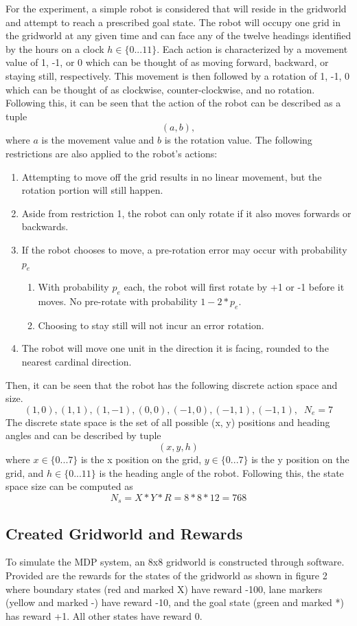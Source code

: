 \documentclass[fullpage]{article}
\begin{document}
For the experiment, a simple robot is considered that will reside in the gridworld and attempt to reach a prescribed goal state. The robot will occupy one grid in the gridworld at any given time and can face any of the twelve headings identified by the hours on a clock $h \in \{0...11\}$. Each action is characterized by a movement value of 1, -1, or 0 which can be thought of as moving forward, backward, or staying still, respectively. This movement is then followed by a rotation of 1, -1, 0 which can be thought of as clockwise, counter-clockwise, and no rotation. Following this, it can be seen that the action of the robot can be described as a tuple
\[
(a, b),
\]
where $a$ is the movement value and $b$ is the rotation value. The following restrictions are also applied to the robot's actions:
\begin{enumerate}
\item Attempting to move off the grid results in no linear movement, but the rotation portion will still happen.
\item Aside from restriction 1, the robot can only rotate if it also moves forwards or backwards.
\item If the robot chooses to move, a pre-rotation error may occur with probability $p_e$
\begin{enumerate}
\item With probability $p_e$ each, the robot will first rotate by +1 or -1 before it moves. No pre-rotate with probability $1-2*p_e$.
\item Choosing to stay still will not incur an error rotation.
\end{enumerate}
\item The robot will move one unit in the direction it is facing, rounded to the nearest cardinal direction.
\end{enumerate}
Then, it can be seen that the robot has the following discrete action space and size.
\[
(1, 0), (1, 1), (1,-1), (0,0), (-1,0), (-1,1), (-1,1), \; \; N_e = 7
\]
The discrete state space is the set of all possible (x, y) positions and heading angles and can be described by tuple
\[
(x, y, h)
\]
where $x \in \{0...7\}$ is the x position on the grid, $y \in \{0...7\}$ is the y position on the grid, and $h \in \{0...11\}$ is the heading angle of the robot. Following this, the state space size can be computed as
\[
N_s = X*Y*R = 8*8*12 = 768
\]

\subsection{Created Gridworld and Rewards}
To simulate the MDP system, an 8x8 gridworld is constructed through software. Provided are the rewards for the states of the gridworld as shown in figure 2 where boundary states (red and marked X) have reward -100, lane markers (yellow and marked -) have reward -10, and the goal state (green and marked *) has reward +1. All other states have reward 0.
\end{document}
